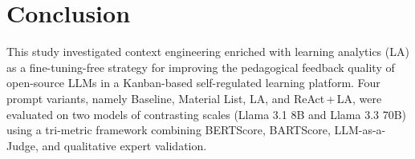 \documentclass[conference,a4paper]{IEEEtran}
\begin{document}


\section{Conclusion}\label{sec:conclusion}

This study investigated context engineering enriched with
learning analytics (LA) as a fine-tuning-free strategy for
improving the pedagogical feedback quality of open-source
LLMs in a Kanban-based self-regulated learning platform.
Four prompt variants, namely Baseline, Material List, LA, and
ReAct\,+\,LA, were evaluated on two models of contrasting
scales (Llama 3.1 8B and Llama 3.3 70B) using a tri-metric
framework combining BERTScore, BARTScore, LLM-as-a-Judge,
and qualitative expert validation.
\end{document}
